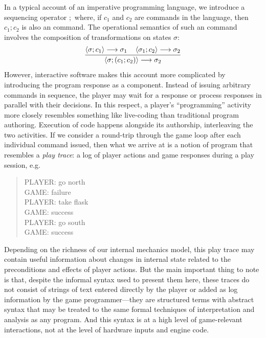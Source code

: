     In a typical account of an imperative programming language, we
    introduce a sequencing operator $;$ where, if $c_1$ and $c_2$ are
    commands in the language, then $c_1;c_2$ is also an command.
    The operational semantics of such an command involves the
    composition of transformations on states $\sigma$:
    \[
      \infer{
        \left< \sigma; (c_1;c_2)\right> \longrightarrow
        \sigma_2
      }
      {
        \left<\sigma; c_1 \right> \longrightarrow
          \sigma_1
        \quad
        \left<\sigma_1; c_2 \right> \longrightarrow
          \sigma_2
      }
    \]
    However, interactive software makes this account more complicated by
    introducing the program response as a component. Instead of issuing
    arbitrary commands in sequence, the player may wait for a response or
    process responses in parallel with their decisions. In this respect, a
    player's ``programming'' activity more closely resembles something like
    live-coding than traditional program authoring. Execution of code
    happens alongside its authorship, interleaving the two activities. If
    we consider a round-trip through the game loop after each individual
    command issued, then what we arrive at is a notion of program that
    resembles a {\em play trace}: a log of player actions and game
    responses during a play session, e.g.
    \begin{quote}
      PLAYER: go north\\
      GAME: failure\\
      PLAYER: take flask\\
      GAME: success\\
      PLAYER: go south\\
      GAME: success
    \end{quote}
    Depending on the richness of our internal mechanics model, this play
    trace may contain useful information about changes in internal state
    related to the preconditions and effects of player actions. But the
    main important thing to note is that, despite the informal syntax used
    to present them here, these traces do not consist of strings of text
    entered directly by the player or added as log information by the game
    programmer---they are structured terms with abstract syntax that may be
    treated to the same formal techniques of interpretation and analysis as
    any program. And this syntax is at a high level of game-relevant
    interactions, not at the level of hardware inputs and engine code.

